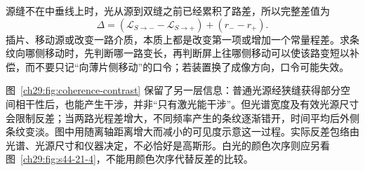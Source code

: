 源缝不在中垂线上时，光从源到双缝之前已经累积了路差，所以完整差值为
\[
 \Delta=(\mathcal L_{S\to -}-\mathcal L_{S\to +})+(r_--r_+).
\]
插片、移动源或改变一路介质，本质上都是改变第一项或增加一个常量程差。求条纹向哪侧移动时，先判断哪一路变长，再判断屏上往哪侧移动可以使该路变短以补偿，而不要只记“向薄片侧移动”的口令；若装置换了成像方向，口令可能失效。


\YoungPanel
\YoungPatternPanel
\begin{center}\begin{minipage}{\linewidth}\centering
{}
\end{minipage}\end{center}

图~\ref{ch29:fig:coherence-contrast} 保留了另一层信息：普通光源经狭缝获得部分空间相干性后，也能产生干涉，并非“只有激光能干涉”。但光谱宽度及有效光源尺寸会限制反差；当两路光程差增大，不同频率产生的条纹逐渐错开，时间平均后外侧条纹变淡。图中用随离轴距离增大而减小的可见度示意这一过程。实际反差包络由光谱、光源尺寸和仪器决定，不必恰好是高斯形。白光的颜色次序则应另看图~\ref{ch29:fig:s44-21-4}，不能用颜色次序代替反差的比较。


